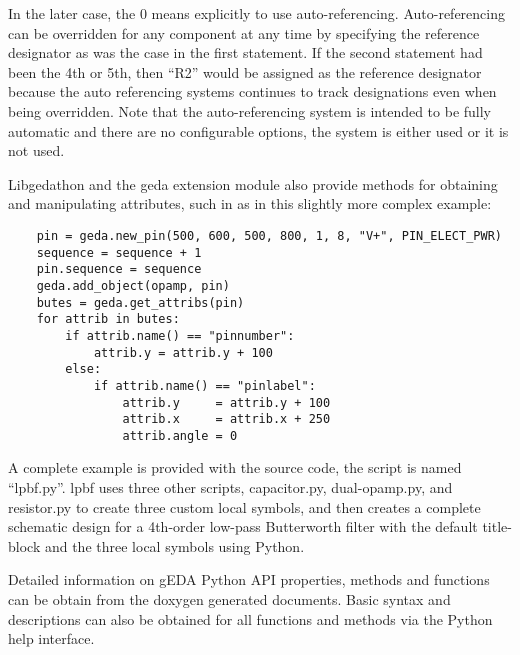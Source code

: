   In the later case, the 0 means explicitly to use auto-referencing. Auto-referencing can be overridden for any component at any time by specifying the reference designator as was the case in the first statement. If the second statement had been the 4th or 5th, then ``R2'' would be assigned as the reference designator because the auto referencing systems continues to track designations even when being overridden. Note that the auto-referencing system is intended to be fully automatic and there are no configurable options, the system is either used or it is not used. 


  Libgedathon and the geda extension module also provide methods for obtaining and manipulating attributes, such in as in this slightly more complex example: \begin{verbatim}
	pin = geda.new_pin(500, 600, 500, 800, 1, 8, "V+", PIN_ELECT_PWR)
	sequence = sequence + 1
	pin.sequence = sequence
	geda.add_object(opamp, pin)
	butes = geda.get_attribs(pin)
	for attrib in butes:
		if attrib.name() == "pinnumber":
		    attrib.y = attrib.y + 100
		else:
		    if attrib.name() == "pinlabel":
		        attrib.y     = attrib.y + 100
		        attrib.x     = attrib.x + 250
		        attrib.angle = 0
\end{verbatim}

  A complete example is provided with the source code, the script is named ``lpbf.py''. lpbf uses three other scripts, capacitor.py, dual-opamp.py, and resistor.py to create three custom local symbols, and then creates a complete schematic design for a 4th-order low-pass Butterworth filter with the default title-block and the three local symbols using Python. 

  Detailed information on gEDA Python API properties, methods and functions can be obtain from the doxygen generated documents. Basic syntax and descriptions can also be obtained for all functions and methods via the Python help interface. 
